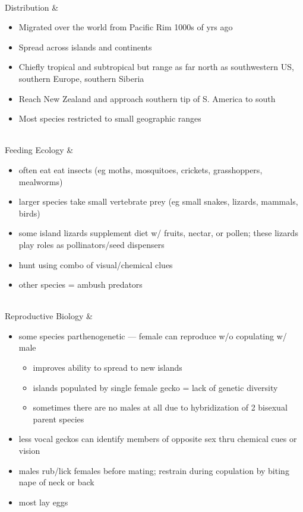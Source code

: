 \begin{center}
\begin{longtabu}
	\\
	\hline
	Distribution & 
	\begin{itemize}[noitemsep]
		\item Migrated over the world from Pacific Rim 1000s of yrs ago
		\item Spread across islands and continents
		\item Chiefly tropical and subtropical but range as far north as southwestern US, southern Europe, southern Siberia
		\item Reach New Zealand and approach southern tip of S. America to south
		\item Most species restricted to small geographic ranges
	\end{itemize}
	\\
	\hline
	Feeding Ecology & 
	\begin{itemize}[noitemsep]
		\item often eat eat insects (eg moths, mosquitoes, crickets, grasshoppers, mealworms)
		\item larger species take small vertebrate prey (eg small snakes, lizards, mammals, birds)
		\item some island lizards supplement diet w/ fruits, nectar, or pollen; these lizards play roles as pollinators/seed dispensers
		\item hunt using combo of visual/chemical clues
		\item other species = ambush predators
	\end{itemize}
	\\
	\hline
	Reproductive Biology & 
	\begin{itemize}[noitemsep]
		\item some species parthenogenetic --- female can reproduce w/o copulating w/ male
			\begin{itemize}[noitemsep]
				\item improves ability to spread to new islands
				\item islands populated by single female gecko = lack of genetic diversity
				\item sometimes there are no males at all due to hybridization of 2 bisexual parent species
			\end{itemize}
		\item less vocal geckos can identify members of opposite sex thru chemical cues or vision
		\item males rub/lick females before mating; restrain during copulation by biting nape of neck or back
		\item most lay eggs

\end{itemize}
\end{longtabu}
\end{center}
